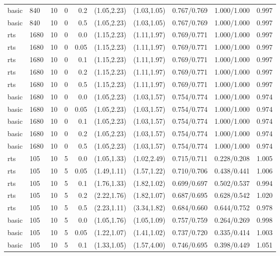 \begin{tabular}{llrrrccccc}
basic & 840 & 10 & 0 & 0.2 & (1.05,2.23) & (1.03,1.05) & 0.767/0.769 & 1.000/1.000 & 0.997 \\
basic & 840 & 10 & 0 & 0.5 & (1.05,2.23) & (1.03,1.05) & 0.767/0.769 & 1.000/1.000 & 0.997 \\
rts & 1680 & 10 & 0 & 0.0 & (1.15,2.23) & (1.11,1.97) & 0.769/0.771 & 1.000/1.000 & 0.997 \\
rts & 1680 & 10 & 0 & 0.05 & (1.15,2.23) & (1.11,1.97) & 0.769/0.771 & 1.000/1.000 & 0.997 \\
rts & 1680 & 10 & 0 & 0.1 & (1.15,2.23) & (1.11,1.97) & 0.769/0.771 & 1.000/1.000 & 0.997 \\
rts & 1680 & 10 & 0 & 0.2 & (1.15,2.23) & (1.11,1.97) & 0.769/0.771 & 1.000/1.000 & 0.997 \\
rts & 1680 & 10 & 0 & 0.5 & (1.15,2.23) & (1.11,1.97) & 0.769/0.771 & 1.000/1.000 & 0.997 \\
basic & 1680 & 10 & 0 & 0.0 & (1.05,2.23) & (1.03,1.57) & 0.754/0.774 & 1.000/1.000 & 0.974 \\
basic & 1680 & 10 & 0 & 0.05 & (1.05,2.23) & (1.03,1.57) & 0.754/0.774 & 1.000/1.000 & 0.974 \\
basic & 1680 & 10 & 0 & 0.1 & (1.05,2.23) & (1.03,1.57) & 0.754/0.774 & 1.000/1.000 & 0.974 \\
basic & 1680 & 10 & 0 & 0.2 & (1.05,2.23) & (1.03,1.57) & 0.754/0.774 & 1.000/1.000 & 0.974 \\
basic & 1680 & 10 & 0 & 0.5 & (1.05,2.23) & (1.03,1.57) & 0.754/0.774 & 1.000/1.000 & 0.974 \\
rts & 105 & 10 & 5 & 0.0 & (1.05,1.33) & (1.02,2.49) & 0.715/0.711 & 0.228/0.208 & 1.005 \\
rts & 105 & 10 & 5 & 0.05 & (1.49,1.11) & (1.57,1.22) & 0.710/0.706 & 0.438/0.441 & 1.006 \\
rts & 105 & 10 & 5 & 0.1 & (1.76,1.33) & (1.82,1.02) & 0.699/0.697 & 0.502/0.537 & 0.994 \\
rts & 105 & 10 & 5 & 0.2 & (2.22,1.76) & (1.82,1.07) & 0.687/0.695 & 0.628/0.542 & 1.020 \\
rts & 105 & 10 & 5 & 0.5 & (2.23,1.11) & (3.34,1.82) & 0.684/0.660 & 0.644/0.752 & 0.978 \\
basic & 105 & 10 & 5 & 0.0 & (1.05,1.76) & (1.05,1.09) & 0.757/0.759 & 0.264/0.269 & 0.998 \\
basic & 105 & 10 & 5 & 0.05 & (1.22,1.07) & (1.41,1.02) & 0.737/0.720 & 0.335/0.414 & 1.003 \\
basic & 105 & 10 & 5 & 0.1 & (1.33,1.05) & (1.57,4.00) & 0.746/0.695 & 0.398/0.449 & 1.051 \\

\end{tabular}
